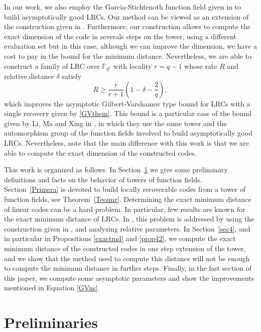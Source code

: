 \documentclass{amsart}
\newcommand{\F}{\mathbb{F}}
\theoremstyle{definition}
\begin{document}
In our work, we also employ the Garcia-Stichtenoth function field given in \cite{GS} to build asymptotically good LRCs. Our method can be viewed as an extension of the construction given in \cite{BargTamoVladut}. Furthermore, our construction allows to compute the exact dimension of the code in severals steps on the tower, using a different evaluation set but in this case, although we can improve the dimension, we have a cost to pay in the bound for the minimum distance. Nevertheless, we are able to construct a family of LRC over 
$\F_{q^2}$ with locality $r=q-1$ whose rate $R$ and relative distance $\delta$ satisfy
\begin{equation}\label{GVus}R\geq \frac{r}{r+1}\left(1-\delta-\frac{2}{q}\right),\end{equation} which improves the asymptotic Gilbert-Varshamov type bound for LRCs with a single recovery given by \eqref{GVthem}.
This bound is a particular case of the bound given by Li, Ma and Xing in \cite{LMX19}, in which they use the same tower and the automorphism group of the function fields involved to build asymptotically good LRCs. Nevertheless, note that the main difference with this work is that we are able to compute the exact dimension of the constructed codes.

This work is organized as follows. In Section~\ref{Pre} we give some preliminary definitions and facts on the behavior of towers of function fields. Section~\ref{Primera} is devoted  to build locally recoverable codes from a tower of function fields, see Theorem~\ref{Teounr}.
Determining the exact minimum distance  of linear codes can be a hard problem. In particular, few results are known for the exact minimum distance of LRCs. In \cite{CKMTW}, this problem is addressed by using the construction given in \cite{HMM}, and analyzing relative parameters. In Section~\ref{sec4}, and in particular in Propositions \ref{exactmd} and \ref{prop42}, we compute the exact minimum distance of the constructed codes in one step extension of the tower, and we show that the method used to compute this distance will not be enough to compute the minimum distance in further steps. Finally, in the last section of this paper, we compute some asymptotic parameters and show the improvements mentioned in Equation \eqref{GVus}. 


 \section{Preliminaries}\label{Pre}
 
\end{document}
